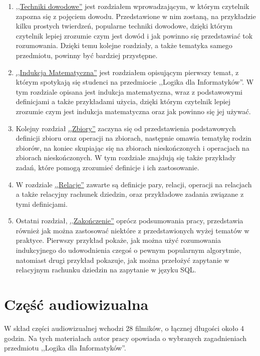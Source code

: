 \begin{enumerate}
    \item \hyperref[chapter:proofs]{,,Techniki dowodowe''} jest rozdziałem wprowadzającym, w którym czytelnik zapozna się z pojęciem dowodu. Przedstawione w nim zostaną, na przykładzie kilku prostych twierdzeń, popularne techniki dowodowe, dzięki którym czytelnik lepiej zrozumie czym jest dowód i jak powinno się przedstawiać tok rozumowania. Dzięki temu kolejne rozdziały, a także tematyka samego przedmiotu, powinny być bardziej przystępne.
    \item \hyperref[chapter:induction]{,,Indukcja Matematyczna''} jest rozdziałem opisującym pierwszy temat, z którym spotykają się studenci na przedmiocie ,,Logika dla Informatyków''. W tym rozdziale opisana jest indukcja matematyczna, wraz z podstawowymi definicjami a także przykładami użycia, dzięki którym czytelnik lepiej zrozumie czym jest indukcja matematyczna oraz jak powinno się jej używać.
    \item Kolejny rozdział \hyperref[chapter:sets]{,,Zbiory''} zaczyna się od przedstawienia podstawowych definicji zbioru oraz operacji na zbiorach, następnie omawia tematykę rodzin zbiorów, na koniec skupiając się na zbiorach nieskończonych i operacjach na zbiorach nieskończonych. W tym rozdziale znajdują się także przykłady zadań, które pomogą zrozumieć definicje i ich zastosowanie.
    \item W rozdziale \hyperref[chapter:relation]{,,Relacje''} zawarte są definicje pary, relacji, operacji na relacjach a także relacyjny rachunek dziedzin, oraz przykładowe zadania związane z tymi definicjami.
    \item Ostatni rozdział, \hyperref[chapter:ending]{,,Zakończenie''} oprócz podsumowania pracy, przedstawia również jak można zastosować niektóre z przedstawionych wyżej tematów w praktyce. Pierwszy przykład pokaże, jak można użyć rozumowania indukcyjnego do udowodnienia czegoś o pewnym popularnym algorytmie, natomiast drugi przykład pokazuje, jak można przełożyć zapytanie w relacyjnym rachunku dziedzin na zapytanie w języku SQL.
\end{enumerate}

\section{Część audiowizualna}
W skład części audiowizualnej wchodzi 28 filmików, o łącznej długości około 4 godzin. Na tych materiałach autor pracy opowiada o wybranych zagadnieniach przedmiotu ,,Logika dla Informatyków''.

